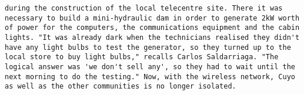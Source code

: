 \documentclass[11pt]{article}
\begin{document}
\begin{Verbatim}[commandchars=\\\{\}]
during the construction of the local telecentre site. There it was necessary to build a mini-hydraulic dam in order to generate 2kW worth of power for the computers, the communications equipment and the cabin lights. "It was already dark when the technicians realised they didn't have any light bulbs to test the generator, so they turned up to the local store to buy light bulbs," recalls Carlos Saldarriaga. "The logical answer was 'we don't sell any', so they had to wait until the next morning to do the testing." Now, with the wireless network, Cuyo as well as the other communities is no longer isolated.                                                                                                                                                                                                                                                                                                                                                                                                                                                                                                                                                                                                                                                                                                                                                                                                                                                                                                                                                                                                                                                                                                                                                                                                                                                          

\end{Verbatim}
\end{document}
